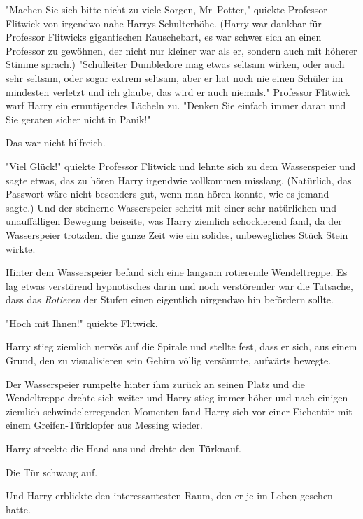 {"Machen Sie sich bitte nicht zu viele Sorgen, Mr~Potter," quiekte Professor Flitwick von irgendwo nahe Harrys Schulterhöhe. (Harry war dankbar für Professor Flitwicks gigantischen Rauschebart, es war schwer sich an einen Professor zu gewöhnen, der nicht nur kleiner war als er, sondern auch mit höherer Stimme sprach.) "Schulleiter Dumbledore mag etwas seltsam wirken, oder auch sehr seltsam, oder sogar extrem seltsam, aber er hat noch nie einen Schüler im mindesten verletzt und ich glaube, das wird er auch niemals." Professor Flitwick warf Harry ein ermutigendes Lächeln zu. "Denken Sie einfach immer daran und Sie geraten sicher nicht in Panik!"

Das war nicht hilfreich.

"Viel Glück!" quiekte Professor Flitwick und lehnte sich zu dem Wasserspeier und sagte etwas, das zu hören Harry irgendwie vollkommen misslang. (Natürlich, das Passwort wäre nicht besonders gut, wenn man hören konnte, wie es jemand sagte.) Und der steinerne Wasserspeier schritt mit einer sehr natürlichen und unauffälligen Bewegung beiseite, was Harry ziemlich schockierend fand, da der Wasserspeier trotzdem die ganze Zeit wie ein solides, unbewegliches Stück Stein wirkte.

Hinter dem Wasserspeier befand sich eine langsam rotierende Wendeltreppe. Es lag etwas verstörend hypnotisches darin und noch verstörender war die Tatsache, dass das \emph{Rotieren} der Stufen einen eigentlich nirgendwo hin befördern sollte.

"Hoch mit Ihnen!" quiekte Flitwick.

Harry stieg ziemlich nervös auf die Spirale und stellte fest, dass er sich, aus einem Grund, den zu visualisieren sein Gehirn völlig versäumte, aufwärts bewegte.

Der Wasserspeier rumpelte hinter ihm zurück an seinen Platz und die Wendeltreppe drehte sich weiter und Harry stieg immer höher und nach einigen ziemlich schwindelerregenden Momenten fand Harry sich vor einer Eichentür mit einem Greifen-Türklopfer aus Messing wieder.

Harry streckte die Hand aus und drehte den Türknauf.

Die Tür schwang auf.

Und Harry erblickte den interessantesten Raum, den er je im Leben gesehen hatte.

}
